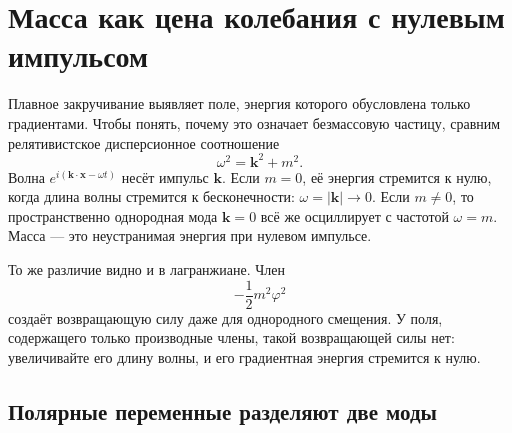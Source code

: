 \begin{classroomqa}
\end{classroomqa}

\section{Масса как цена колебания с нулевым импульсом}

Плавное закручивание выявляет поле, энергия которого обусловлена только градиентами. Чтобы
понять, почему это означает безмассовую частицу, сравним релятивистское
дисперсионное соотношение
\begin{equation}
  \omega^2=\bm{k}^2+m^2.
  \label{eq:l07-dispersion}
\end{equation}
Волна \(e^{i(\bm{k}\cdot\bm{x}-\omega t)}\) несёт импульс \(\bm{k}\).
Если \(m=0\), её энергия стремится к нулю, когда длина волны стремится к бесконечности:
\(\omega=|\bm{k}|\to0\). Если \(m\ne0\), то пространственно однородная мода
\(\bm{k}=0\) всё же осциллирует с частотой \(\omega=m\). Масса — это
неустранимая энергия при нулевом импульсе.

То же различие видно и в лагранжиане. Член
\begin{equation}
  -\frac12m^2\varphi^2
\end{equation}
создаёт возвращающую силу даже для однородного смещения. У поля, содержащего
только производные члены, такой возвращающей силы нет: увеличивайте его длину волны,
и его градиентная энергия стремится к нулю.

\subsection{Полярные переменные разделяют две моды}

